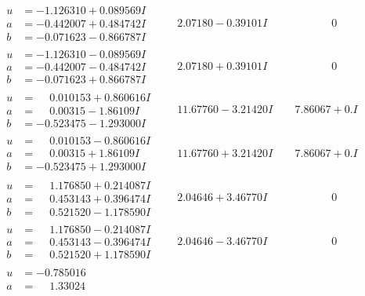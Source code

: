 \documentclass[1p]{elsarticle_modified}
\theoremstyle{definition}
\begin{document}
$$\begin{array}{c|c|c}
\begin{aligned}
u &= -1.126310 + 0.089569 I \\
a &= -0.442007 + 0.484742 I \\
b &= -0.071623 - 0.866787 I\end{aligned}
 & \phantom{-}2.07180 - 0.39101 I & \phantom{-0.000000 } 0 \\ \hline\begin{aligned}
u &= -1.126310 - 0.089569 I \\
a &= -0.442007 - 0.484742 I \\
b &= -0.071623 + 0.866787 I\end{aligned}
 & \phantom{-}2.07180 + 0.39101 I & \phantom{-0.000000 } 0 \\ \hline\begin{aligned}
u &= \phantom{-}0.010153 + 0.860616 I \\
a &= \phantom{-}0.00315 - 1.86109 I \\
b &= -0.523475 - 1.293000 I\end{aligned}
 & \phantom{-}11.67760 - 3.21420 I & \phantom{-}7.86067 + 0. I\phantom{ +0.000000I} \\ \hline\begin{aligned}
u &= \phantom{-}0.010153 - 0.860616 I \\
a &= \phantom{-}0.00315 + 1.86109 I \\
b &= -0.523475 + 1.293000 I\end{aligned}
 & \phantom{-}11.67760 + 3.21420 I & \phantom{-}7.86067 + 0. I\phantom{ +0.000000I} \\ \hline\begin{aligned}
u &= \phantom{-}1.176850 + 0.214087 I \\
a &= \phantom{-}0.453143 + 0.396474 I \\
b &= \phantom{-}0.521520 - 1.178590 I\end{aligned}
 & \phantom{-}2.04646 + 3.46770 I & \phantom{-0.000000 } 0 \\ \hline\begin{aligned}
u &= \phantom{-}1.176850 - 0.214087 I \\
a &= \phantom{-}0.453143 - 0.396474 I \\
b &= \phantom{-}0.521520 + 1.178590 I\end{aligned}
 & \phantom{-}2.04646 - 3.46770 I & \phantom{-0.000000 } 0 \\ \hline\begin{aligned}
u &= -0.785016\phantom{ +0.000000I} \\
a &= \phantom{-}1.33024\phantom{ +0.000000I} \\

\end{aligned}
\end{array}$$
\end{document}
